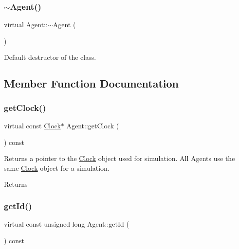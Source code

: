 \subsubsection{\texorpdfstring{$\sim$\+Agent()}{~Agent()}}
{\footnotesize\ttfamily virtual Agent\+::$\sim$\+Agent (\begin{DoxyParamCaption}{ }\end{DoxyParamCaption})\hspace{0.3cm}{\ttfamily [virtual]}}

Default destructor of the class. 

\subsection{Member Function Documentation}
\mbox{\label{class_agent_ae872060d974c4a5aec875680db38cc68}} 
\subsubsection{\texorpdfstring{get\+Clock()}{getClock()}}
{\footnotesize\ttfamily virtual const \hyperlink{class_clock}{Clock}$\ast$ Agent\+::get\+Clock (\begin{DoxyParamCaption}{ }\end{DoxyParamCaption}) const\hspace{0.3cm}{\ttfamily [virtual]}}

Returns a pointer to the \hyperlink{class_clock}{Clock} object used for simulation. All Agents use the same \hyperlink{class_clock}{Clock} object for a simulation. \begin{DoxyReturn}{Returns}

\end{DoxyReturn}
\mbox{\label{class_agent_aa5267ab07bb62f1ed3dfddca286b6ef6}} 
\subsubsection{\texorpdfstring{get\+Id()}{getId()}}
{\footnotesize\ttfamily virtual const unsigned long Agent\+::get\+Id (\begin{DoxyParamCaption}{ }\end{DoxyParamCaption}) const\hspace{0.3cm}{\ttfamily [virtual]}}

